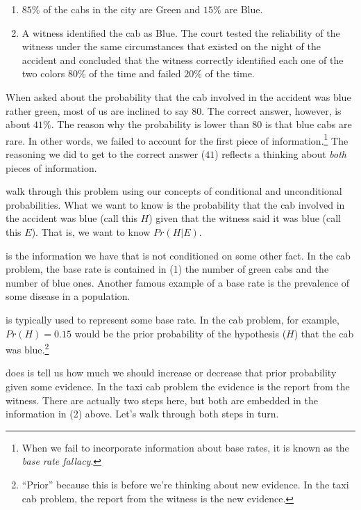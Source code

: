 \documentclass[]{tufte-book}
\providecommand{\tightlist}{%
  \setlength{\itemsep}{0pt}\setlength{\parskip}{0pt}}
\begin{document}
\begin{enumerate}
\def\labelenumi{\arabic{enumi}.}
\tightlist
\item
  \(85\%\) of the cabs in the city are Green and \(15\%\) are Blue.
\item
  A witness identified the cab as Blue. The court tested the reliability of the witness under the same circumstances that existed on the night of the accident and concluded that the witness correctly identified each one of the two colors \(80\%\) of the time and failed \(20\%\) of the time.
\end{enumerate}

When asked about the probability that the cab involved in the accident was blue rather green, most of us are inclined to say \(80%
\). The correct answer, however, is about \(41\%\). The reason why the probability is lower than \(80%
\) is that blue cabs are rare. In other words, we failed to account for the first piece of information.\footnote{When we fail to incorporate information about base rates, it is known as the \emph{base rate fallacy}.} The reasoning we did to get to the correct answer (\(41%
\)) reflects a thinking about \emph{both} pieces of information.

 walk through this problem using our concepts of conditional and unconditional probabilities. What we want to know is the probability that the cab involved in the accident was blue (call this \(H\)) given that the witness said it was blue (call this \(E\)). That is, we want to know \(Pr(H|E)\).

 is the information we have that is not conditioned on some other fact. In the cab problem, the base rate is contained in (1) the number of green cabs and the number of blue ones. Another famous example of a base rate is the prevalence of some disease in a population.

 is typically used to represent some base rate. In the cab problem, for example, \(Pr(H)=0.15\) would be the prior probability of the hypothesis (\(H\)) that the cab was blue.\footnote{``Prior'' because this is before we're thinking about new evidence. In the taxi cab problem, the report from the witness is the new evidence.}

 does is tell us how much we should increase or decrease that prior probability given some evidence. In the taxi cab problem the evidence is the report from the witness. There are actually two steps here, but both are embedded in the information in (2) above. Let's walk through both steps in turn.
\end{document}

